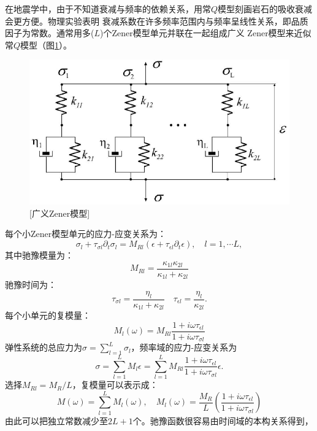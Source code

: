 在地震学中，由于不知道衰减与频率的依赖关系，用常$Q$模型刻画岩石的吸收衰减会更方便。物理实验表明
衰减系数在许多频率范围内与频率呈线性关系，即品质因子为常数。通常用多($L$)个Zener模型单元并联在一起组成广义
Zener模型来近似常$Q$模型（图\ref{fig:zener}）。
\begin{figure}[!htbp]
	    \centering
		\includegraphics[width=0.7\linewidth]{figure/zener}
	    [广义Zener模型]
		\label{fig:zener}
\end{figure}
每个小Zener模型单元的应力-应变关系为：
\begin{equation}
	\sigma_l+\tau_{\sigma l}\partial_t\sigma_l=M_{Rl}(\epsilon+\tau_{\epsilon l}
	\partial_t\epsilon), \quad l=1,\cdots L,
\end{equation}
其中驰豫模量为：
\begin{equation}
	M_{Rl}=\frac{\kappa_{1l}\kappa_{2l}}{\kappa_{1l}+\kappa_{2l}}
\end{equation}
驰豫时间为：
\begin{equation}
	\tau_{\sigma l}=\frac{\eta_l}{\kappa_{1l}+\kappa_{2l}} \quad \tau_{\epsilon l}=
	\frac{\eta_l}{\kappa_{2l}}.
\end{equation}
每个小单元的复模量：
\begin{equation}
	M_l(\omega)=M_{Rl}\frac{1+i\omega\tau_{\epsilon l}}{1+i\omega\tau_{\sigma l}}
\end{equation}
弹性系统的总应力为$\sigma=\sum_{l=1}^{L}\sigma_l$，频率域的应力-应变关系为
\begin{equation}
	\sigma=\sum_{l=1}^{L}M_l\epsilon=\sum_{l=1}^{L}M_{Rl}\frac{1+i\omega\tau_{\epsilon l}}
	{1+i\omega\tau_{\sigma l}}\epsilon.
\end{equation}
选择$M_{Rl}=M_R/L$，复模量可以表示成：
\begin{equation}
	M(\omega)=\sum_{l=1}^{L}M_l(\omega), \quad M_l(\omega)=\frac{M_R}{L}
	(\frac{1+i\omega\tau_{\epsilon l}}{1+i\omega\tau_{\sigma l}})
\end{equation}
由此可以把独立常数减少至$2L+1$个。驰豫函数很容易由时间域的本构关系得到，
